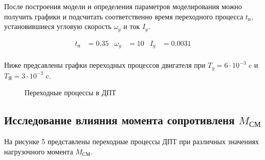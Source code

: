 \documentclass[a4paper, 12pt]{article}
\begin{document}
После построения модели и определения параметров моделирования можно получить графики и подсчитать соответственно время переходного процесса $t_\text{п}$, установившиеся угловую скорость $\omega_y$ и ток $I_y$.

\begin{align*}
    t_\text{п} & = 0.35 & \omega_y & = 10 & I_y & = 0.0031 \\
\end{align*}

Ниже предсавлены графки переходных процессов двигателя при $T_y = 6\cdot10^{-3}$ c и $T_\text{Я} = 3\cdot10^{-3}$ c.

\begin{figure}[h!]
    \centering
    \caption{Переходные процессы в ДПТ}
\end{figure}
\newpage
\begin{center}
\section{Исследование влияния момента сопротивленя $M_\text{СМ}$}
\end{center}
\par На рисунке 5 представлены переходные процессы ДПТ при различных значениях нагрузочного момента $M_\text{СМ}$.
\end{document}
